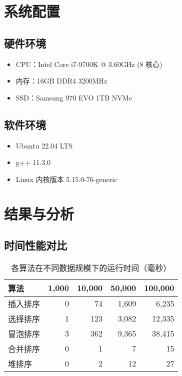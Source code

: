 \documentclass[UTF8]{article}
\begin{document}
\section{系统配置}
\subsection{硬件环境}
\begin{itemize}
    \item CPU：Intel Core i7-9700K @ 3.60GHz (8 核心)
    \item 内存：16GB DDR4 3200MHz
    \item SSD：Samsung 970 EVO 1TB NVMe
\end{itemize}

\subsection{软件环境}
\begin{itemize}
    \item Ubuntu 22.04 LTS
    \item g++ 11.3.0
    \item Linux 内核版本 5.15.0-76-generic
\end{itemize}

\section{结果与分析}
\subsection{时间性能对比}
\begin{table}[h]
\centering
\caption{各算法在不同数据规模下的运行时间（毫秒）}
\label{tab:time}
\begin{tabular}{lrrrr}
\toprule
算法 & 1,000 & 10,000 & 50,000 & 100,000 \\
\midrule
插入排序 & 0 & 74 & 1,609 & 6,235 \\
选择排序 & 1 & 123 & 3,082 & 12,335 \\
冒泡排序 & 3 & 362 & 9,365 & 38,415 \\
合并排序 & 0 & 1 & 7 & 15 \\
堆排序 & 0 & 2 & 12 & 27 \\
\bottomrule
\end{tabular}
\end{table}
\end{document}
